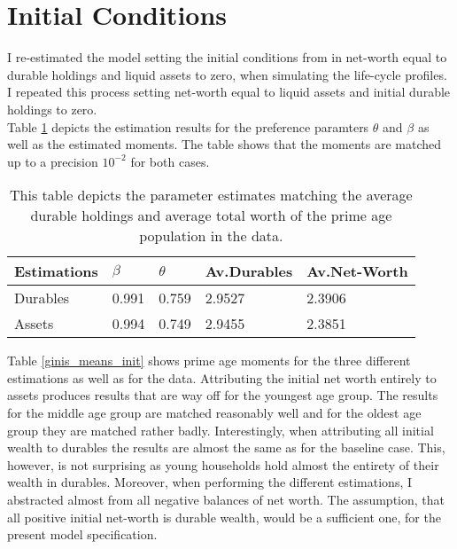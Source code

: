 \documentclass[a4paper,12pt,legno]{article}
\begin{document}
\section{Initial Conditions}
\label{initial_conditions}

I re-estimated the model setting the initial conditions from \cite{hintermaier2011} in net-worth equal to durable holdings and liquid assets to zero, when simulating the life-cycle profiles. I repeated this process setting net-worth equal to liquid assets and initial durable holdings to zero.\\
Table \ref{estimates_initial_cond} depicts the estimation results for the preference paramters $\theta$ and $\beta$ as well as the estimated moments. The table shows that the moments are matched up to a precision $10^{-2}$ for both cases. 

\begin{table}[!htbp]
\centering
\caption{This table depicts the parameter estimates matching the average durable holdings and average total worth of the prime age population in the data.}
\label{estimates_initial_cond}
\begin{tabular}{llllll}
\hline
\multicolumn{2}{l}{Estimations} & $\beta$ & $\theta$ & Av.Durables & Av.Net-Worth\\ \hline
\multicolumn{2}{l}{Durables}             & 0.991    & 0.759  & 2.9527 & 2.3906      \\
\multicolumn{2}{l}{Assets}            & 0.994   & 0.749   & 2.9455 & 2.3851    
\end{tabular}
\end{table}

Table \ref{ginis_means_init} shows prime age moments for the three different estimations as well as for the data. Attributing the initial net worth entirely to assets produces results that are way off for the youngest age group. The results for the middle age group are matched reasonably well and for the oldest age group they are matched rather badly. Interestingly, when attributing all initial wealth to durables the results are almost the same as for the baseline case. This, however, is not surprising as young households hold almost the entirety of their wealth in durables. Moreover, when performing the different estimations, I abstracted almost from all negative balances of net worth. 
The assumption, that all positive initial net-worth is durable wealth, would be a sufficient one, for the present model specification. 
\end{document}
